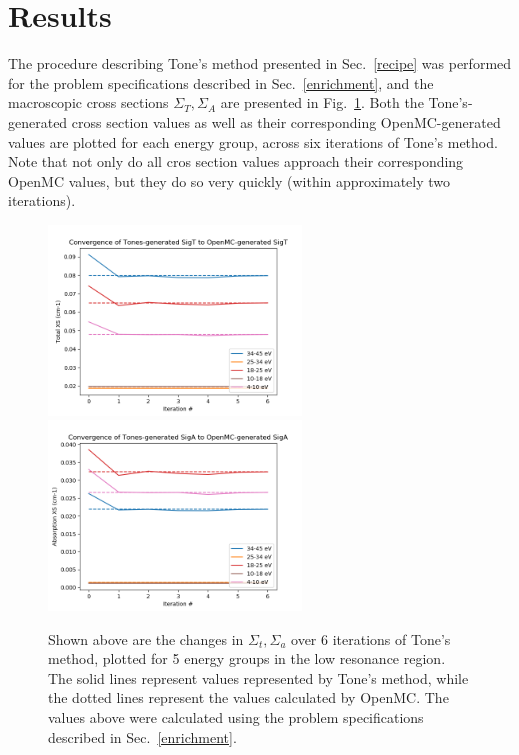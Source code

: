 \documentclass[10pt]{article}
\begin{document}
  \section{Results}
  The procedure describing Tone's method presented in Sec.~\ref{recipe} was performed for the problem specifications described in Sec.~\ref{enrichment}, and the macroscopic cross sections $\Sigma_T,\Sigma_A$ are presented in Fig.~\ref{fig:results1}. Both the Tone's-generated cross section values as well as their corresponding OpenMC-generated values are plotted for each energy group, across six iterations of Tone's method. Note that not only do all cros section values approach their corresponding OpenMC values, but they do so very quickly (within approximately two iterations).
  \begin{figure}
    \begin{center}
    \includegraphics[width=0.6\textwidth]{convergence_of_tones_sigT}
    \includegraphics[width=0.6\textwidth]{convergence_of_tones_sigA}
      \caption{Shown above are the changes in $\Sigma_t,\Sigma_a$ over 6 iterations of Tone's method, plotted for 5 energy groups in the low resonance region. The solid lines represent values represented by Tone's method, while the dotted lines represent the values calculated by OpenMC. The values above were calculated using the problem specifications described in Sec.~\ref{enrichment}.}
      \label{fig:results1}
    \end{center}
  \end{figure}
\end{document}
